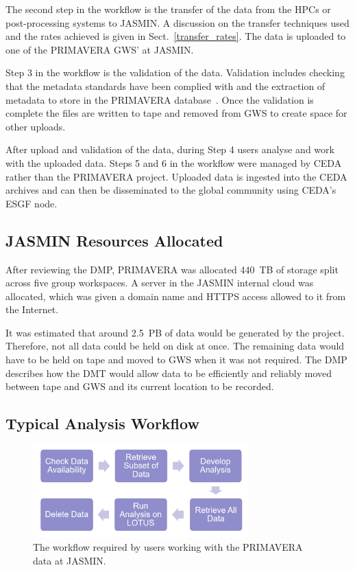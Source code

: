 \documentclass[gmd, manuscript]{copernicus}
\begin{document}
The second step in the workflow is the transfer of the data from the HPCs or post-processing systems to JASMIN. A discussion on the transfer techniques used and the rates achieved is given in Sect.~\ref{transfer_rates}. The data is uploaded to one of the PRIMAVERA GWS' at JASMIN.

Step 3 in the workflow is the validation of the data. Validation includes checking that the metadata standards have been complied with and the extraction of metadata to store in the PRIMAVERA database~\citep{Seddon2020}. Once the validation is complete the files are written to tape and removed from GWS to create space for other uploads.

After upload and validation of the data, during Step 4 users analyse and work with the uploaded data. Steps 5 and 6 in the workflow were managed by CEDA rather than the PRIMAVERA project. Uploaded data is ingested into the CEDA archives and can then be disseminated to the global community using CEDA's ESGF node.


\subsection{JASMIN Resources Allocated}

After reviewing the DMP, PRIMAVERA was allocated 440~TB of storage split across  five group workspaces. A server in the JASMIN internal cloud was allocated, which was given a domain name and  HTTPS access allowed to it from the Internet.

It was estimated that around 2.5~PB of data would be generated by the project. Therefore, not all data could be held on disk at once. The remaining data would have to be held on tape and moved to GWS when it was not required. The DMP describes how the DMT would allow data to be efficiently and reliably moved between tape and GWS and its current location to be recorded.

\subsection{Typical Analysis Workflow}

\begin{figure}[t]
	\includegraphics[width=8.3cm]{fig02.png}
	\caption{The workflow required by users working with the PRIMAVERA data at JASMIN.}
	\label{analysis_workflow}
\end{figure}
\end{document}
